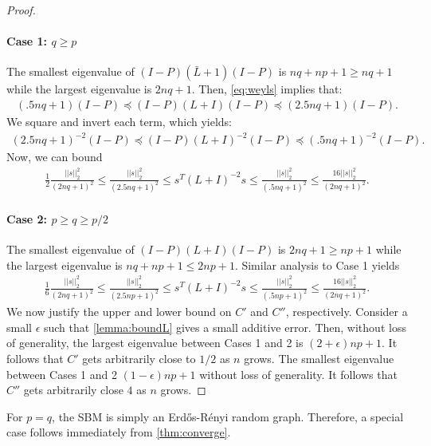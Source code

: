 \begin{proof}
\paragraph{Case 1: \boldmath$q \geq p$}
The smallest eigenvalue of $(I-P)(\bar{L}+1)(I-P)$
is $nq+np+1 \geq nq+1$ while the largest eigenvalue is $2nq+1$.
Then, \cref{eq:weyls} implies that:
\begin{align}
    (.5nq + 1)(I-P)\preceq(I-P)(L+I)(I-P)\preceq(2.5nq+1)(I-P)
    \nonumber.
\end{align}
We square and invert each term, which yields:
\begin{align}
    (2.5nq + 1)^{-2}(I-P)\preceq(I-P)(L+I)^{-2}(I-P)
    \preceq(.5nq+1)^{-2}(I-P).
    \nonumber
\end{align}
Now, we can bound
\begin{align}
    \frac{1}{2} \frac{||s||_2^2}{(2nq+1)^2}
    \leq \frac{||s||_2^2}{(2.5nq+1)^2}
    \leq s^T(L+I)^{-2}s
    \leq \frac{||s||_2^2}{(.5nq+1)^2}
    \leq \frac{16||s||_2^2}{(2nq+1)^2}.
    \nonumber
\end{align}

\paragraph{Case 2: \boldmath$p \geq q \geq p/2$}
The smallest eigenvalue of 
$(I-P)(L+I)(I-P)$ is $2nq+1 \geq np+1$
while the largest eigenvalue is $nq+np+1 \leq 2np+1$.
Similar analysis to Case 1 yields
\begin{align}
    \frac{1}{6}\frac{||s||_2^2}{(2nq+1)^2}
    \leq \frac{||s||_2^2}{(2.5np+1)^2}
    \leq s^T(L+I)^{-2}s
    \leq \frac{||s||_2^2}{(.5np+1)^2}
    \leq \frac{16||s||_2^2}{(2nq+1)^2}.
    \nonumber
\end{align}
We now justify the
upper and lower bound on $C'$
and $C''$, respectively.
Consider a small $\epsilon$ such that
\cref{lemma:boundL} gives a small additive error.
Then, without loss of generality, the largest eigenvalue between Cases 1 and 2
is $(2+\epsilon)np+1$.
It follows that $C'$ gets arbitrarily close to $1/2$
as $n$ grows.
The smallest eigenvalue between Cases 1 and 2
$(1-\epsilon)np+1$ without loss of generality.
It follows that $C''$ gets arbitrarily close $4$
as $n$ grows.
\end{proof}

For $p=q$, the SBM
is simply an Erdős-Rényi random graph.
Therefore, a special case follows immediately
from \cref{thm:converge}.

